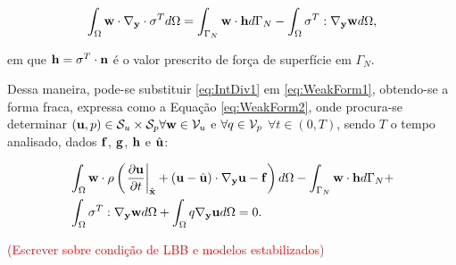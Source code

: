 \documentclass[_ArquivoPrincipal.tex]{subfiles}
\begin{document}
\begin{equation}
     \int_\Omega{\mathbf{w}\cdot\mathbf{\nabla_y}\cdot\mathbf{\sigma}^Td\Omega}=
     \int_{\Gamma_N}{\mathbf{w}\cdot\mathbf{h}d\Gamma_N}-\int_\Omega{\mathbf{\sigma}^T:\mathbf{\nabla_y}\mathbf{w}d\Omega}\text{,}
     \label{eq:IntDiv1}
\end{equation}

\noindent em que $\mathbf{h}=\mathbf{\sigma}^T\cdot\mathbf{n}$ é o valor prescrito de força de superfície em $\Gamma_N$.

Dessa maneira, pode-se substituir \ref{eq:IntDiv1} em \ref{eq:WeakForm1}, obtendo-se a forma fraca, expressa como a Equação \ref{eq:WeakForm2}, onde procura-se determinar $(\mathbf{u},p)\in\mathcal{S}_u\times\mathcal{S}_p\forall\mathbf{w}\in\mathcal{V}_u$ e $\forall q\in\mathcal{V}_p$ $\forall t\in(0,T)$, sendo $T$ o tempo analisado, dados $\mathbf{f}$, $\mathbf{g}$, $\mathbf{h}$ e $\hat{\mathbf{u}}$:

\begin{equation}
    \begin{split}
        &\int_\Omega{\mathbf{w}\cdot\rho\left(\left.\frac{\partial{\mathbf{u}}}{\partial{t}}\right|_{\hat{\mathbf{x}}}+(\mathbf{u}-\hat{\mathbf{u}})\cdot\mathbf{\nabla_y}\mathbf{u}-\mathbf{f}\right)d\Omega}-\int_{\Gamma_N}{\mathbf{w}\cdot\mathbf{h}d\Gamma_N}+\\
        &\int_\Omega{\mathbf{\sigma}^T:\mathbf{\nabla_y}\mathbf{w}d\Omega}+\int_\Omega{q\mathbf{\nabla_y}\mathbf{u}d\Omega}=0\text{.}
    \end{split}
    \label{eq:WeakForm2}
\end{equation}

\textcolor{red}{(Escrever sobre condição de LBB e modelos estabilizados)}
\end{document}
